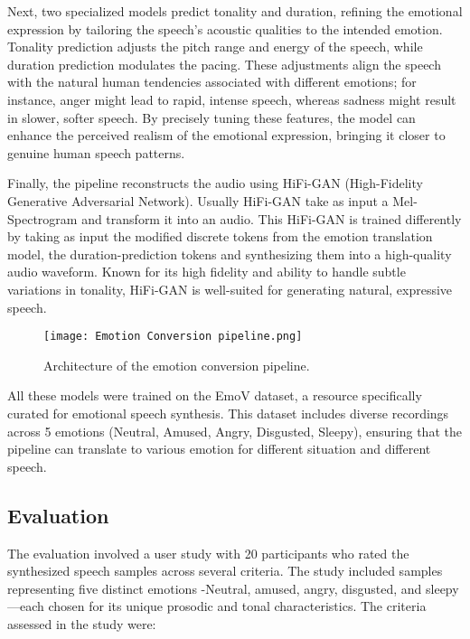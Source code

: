 Next, two specialized models predict tonality and duration, refining the emotional expression by tailoring the speech’s acoustic qualities to the intended emotion. Tonality prediction adjusts the pitch range and energy of the speech, while duration prediction modulates the pacing. These adjustments align the speech with the natural human tendencies associated with different emotions; for instance, anger might lead to rapid, intense speech, whereas sadness might result in slower, softer speech. By precisely tuning these features, the model can enhance the perceived realism of the emotional expression, bringing it closer to genuine human speech patterns.

Finally, the pipeline reconstructs the audio using HiFi-GAN (High-Fidelity Generative Adversarial Network)\cite{kong2020hifi}. Usually HiFi-GAN take as input a Mel-Spectrogram and transform it into an audio. This HiFi-GAN is trained differently by taking as input the modified discrete tokens from the emotion translation model, the duration-prediction tokens and synthesizing them into a high-quality audio waveform. Known for its high fidelity and ability to handle subtle variations in tonality, HiFi-GAN is well-suited for generating natural, expressive speech.

\begin{figure}[h!]
    \centering
    \texttt{[image: Emotion Conversion pipeline.png]}
    \caption{Architecture of the emotion conversion pipeline.}
    \vspace{0.1cm}
    \label{fig:emotion_conversion}
\end{figure}

All these models were trained on the EmoV dataset\cite{adigwe2018emotional}, a resource specifically curated for emotional speech synthesis. This dataset includes diverse recordings across 5 emotions (Neutral, Amused, Angry, Disgusted, Sleepy), ensuring that the pipeline can translate to various emotion for different situation and different speech.

\subsection{Evaluation}
The evaluation involved a user study with 20 participants who rated the synthesized speech samples across several criteria. The study included samples representing five distinct emotions -Neutral, amused, angry, disgusted, and sleepy—each chosen for its unique prosodic and tonal characteristics. The criteria assessed in the study were:

